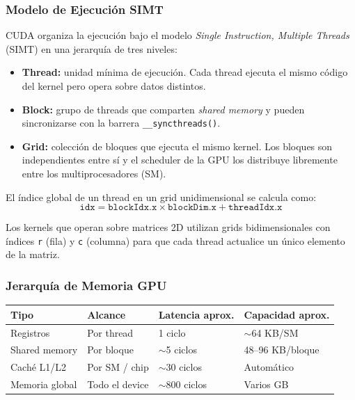 \documentclass[12pt,a4paper]{article}
\begin{document}
\subsubsection{Modelo de Ejecución SIMT}

CUDA organiza la ejecución bajo el modelo \textit{Single Instruction, Multiple Threads}
(SIMT) en una jerarquía de tres niveles:

\begin{itemize}
  \item \textbf{Thread:} unidad mínima de ejecución. Cada thread ejecuta el mismo código
    del kernel pero opera sobre datos distintos.
  \item \textbf{Block:} grupo de threads que comparten \textit{shared memory} y pueden
    sincronizarse con la barrera \texttt{\_\_syncthreads()}.
  \item \textbf{Grid:} colección de bloques que ejecuta el mismo kernel. Los bloques
    son independientes entre sí y el scheduler de la GPU los distribuye libremente
    entre los multiprocesadores (SM).
\end{itemize}

El índice global de un thread en un grid unidimensional se calcula como:
\begin{equation}
  \texttt{idx} = \texttt{blockIdx.x} \times \texttt{blockDim.x} + \texttt{threadIdx.x}
  \label{eq:cuda_idx}
\end{equation}

Los kernels que operan sobre matrices 2D utilizan grids bidimensionales con índices
\texttt{r} (fila) y \texttt{c} (columna) para que cada thread actualice un único
elemento de la matriz.

\subsubsection{Jerarquía de Memoria GPU}

\begin{center}
\begin{tabular}{llll}
\toprule
\textbf{Tipo}      & \textbf{Alcance}   & \textbf{Latencia aprox.} & \textbf{Capacidad aprox.} \\
\midrule
Registros          & Por thread         & 1 ciclo                  & $\sim$64 KB/SM \\
Shared memory      & Por bloque         & $\sim$5 ciclos           & 48--96 KB/bloque \\
Caché L1/L2        & Por SM / chip      & $\sim$30 ciclos          & Automático \\
Memoria global     & Todo el device     & $\sim$800 ciclos         & Varios GB \\
\bottomrule
\end{tabular}
\end{center}
\end{document}
